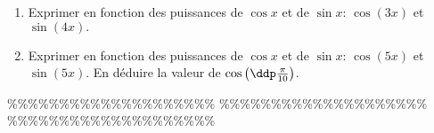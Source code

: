 



\begin{exercice}  \;
\begin{enumerate}
\item Exprimer en fonction des puissances de $\cos{x}$ et de $\sin{x}$: $\cos{(3x)}$ et $\sin{(4x)}.$
\item Exprimer en fonction des puissances de $\cos{x}$ et de $\sin{x}$: $\cos{(5x)}$ et $\sin{(5x)}.$ En d\'eduire la valeur de $\cos{\left(  \ddp\frac{\pi}{10}\right)}$.
\end{enumerate}
\end{exercice}


\%\%\%\%\%\%\%\%\%\%\%\%\%\%\%\%\%\%\%\%
\%\%\%\%\%\%\%\%\%\%\%\%\%\%\%\%\%\%\%\%
\%\%\%\%\%\%\%\%\%\%\%\%\%\%\%\%\%\%\%\%




